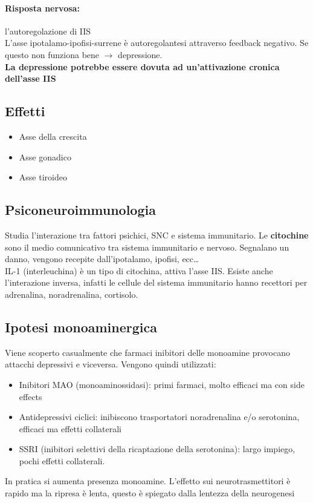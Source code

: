 \documentclass[12pt, a4paper]{article}
\begin{document}
\paragraph{Risposta nervosa:} l'autoregolazione di IIS\\
L'asse ipotalamo-ipofisi-surrene è autoregolantesi attraverso feedback negativo. Se questo non funziona bene $\rightarrow$ depressione.\\
\textbf{La depressione potrebbe essere dovuta ad un'attivazione cronica dell'asse IIS} 

\subsection{Effetti}

\begin{itemize}
    \item Asse della crescita
    \item Asse gonadico
    \item Asse tiroideo
\end{itemize}

\subsection{Psiconeuroimmunologia} 

Studia l'interazione tra fattori psichici, SNC e sistema immunitario.
Le \textbf{citochine} sono il medio comunicativo tra sistema immunitario e nervoso. Segnalano un danno, vengono recepite dall'ipotalamo, ipofisi, ecc\ldots
\medskip\\ 
IL-1 (interleuchina) è un tipo di citochina, attiva l'asse IIS\@.
Esiste anche l'interazione inversa, infatti le cellule del sistema immunitario hanno recettori per adrenalina, noradrenalina, cortisolo.

\subsection{Ipotesi monoaminergica} 

Viene scoperto casualmente che farmaci inibitori delle monoamine provocano attacchi depressivi e viceversa.
Vengono quindi utilizzati:
\begin{itemize}
    \item Inibitori MAO (monoaminossidasi): primi farmaci, molto efficaci ma con side effects
    \item Antidepressivi ciclici: inibiscono trasportatori noradrenalina e/o serotonina, efficaci ma effetti collaterali
    \item SSRI (inibitori selettivi della ricaptazione della serotonina): largo impi\-ego, pochi effetti collaterali.
\end{itemize}
In pratica si aumenta presenza monoamine.
L'effetto sui neurotrasmettitori è rapido ma la ripresa è lenta, questo è spiegato dalla lentezza della neurogenesi
\end{document}
